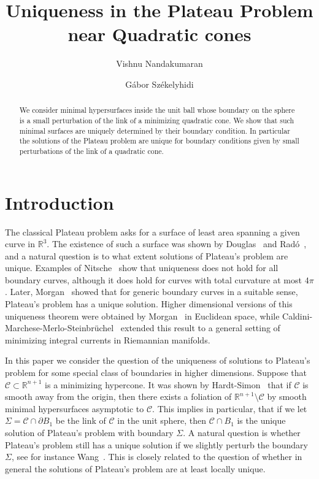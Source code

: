 \documentclass[12pt, reqno ]{amsart}
\title{Uniqueness in the Plateau Problem near Quadratic cones}
\author{Vishnu Nandakumaran}
\author{G\'abor Sz\'ekelyhidi}
\numberwithin{equation}{section}
\begin{document}
\begin{abstract}
We consider minimal hypersurfaces inside the unit ball whose boundary on the sphere is a small perturbation of the link of a minimizing quadratic cone. We show that such minimal surfaces are uniquely determined by their boundary condition. In particular the solutions of the Plateau problem are unique for  boundary conditions given by small perturbations of the link of a quadratic cone. 
\end{abstract}

\maketitle

\section{Introduction}

The classical Plateau problem asks for a surface of least area
spanning a given curve in $\mathbb{R}^3$. The existence of such a
surface was shown by Douglas~\cite{Douglas31} and Rad\'o~\cite{Rado30}, and a natural
question is to what extent solutions of Plateau's problem are
unique. Examples of Nitsche~\cite{Nitsche68} show that uniqueness does not
hold for all boundary curves, although it does hold for curves with
total curvature at most $4\pi$. Later, Morgan~\cite{Morgan78} showed that
for generic boundary curves in a suitable sense, Plateau's problem has a unique
solution.  Higher dimensional versions of this uniqueness theorem
were obtained by Morgan~\cite{Morgan82} in Euclidean space, while
Caldini-Marchese-Merlo-Steinbr\"uchel~\cite{CMMS24} extended this result
to a general setting of minimizing integral currents in Riemannian
manifolds.

In this paper we consider the question of the uniqueness of solutions
to Plateau's problem for some special class of boundaries in higher
dimensions. Suppose that $\mathcal{C}\subset \mathbb{R}^{n+1}$ is a
minimizing hypercone. It was shown by Hardt-Simon~\cite{SimonHardt} that if
$\mathcal{C}$ is smooth away from the origin, then there exists a
foliation of $\mathbb{R}^{n+1}\setminus \mathcal{C}$ by smooth minimal
hypersurfaces asymptotic to $\mathcal{C}$. This implies in particular,
that if we let $\Sigma = \mathcal{C} \cap \partial B_1$ be the link of
$\mathcal{C}$ in the unit sphere, then $\mathcal{C}\cap B_1$ is the
unique solution of Plateau's problem with boundary
$\Sigma$. A natural question is whether Plateau's
problem still has a unique solution if we slightly perturb the
boundary $\Sigma$, see for instance Wang~\cite[P4.1]{wang2020deformationssingularminimalhypersurfaces}.
This is closely related to the question of whether
in general the solutions of Plateau's problem are at least locally
unique.
\end{document}
